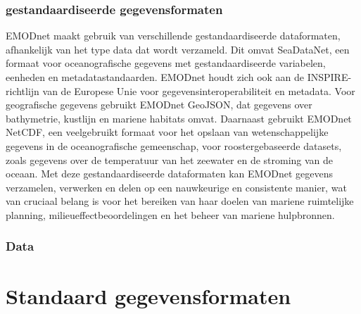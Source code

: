 \subsubsection{gestandaardiseerde gegevensformaten}
EMODnet maakt gebruik van verschillende gestandaardiseerde dataformaten, afhankelijk van het type data dat wordt verzameld. Dit omvat SeaDataNet, een formaat voor oceanografische gegevens met gestandaardiseerde variabelen, eenheden en metadatastandaarden. EMODnet houdt zich ook aan de INSPIRE-richtlijn van de Europese Unie voor gegevensinteroperabiliteit en metadata. Voor geografische gegevens gebruikt EMODnet GeoJSON, dat gegevens over bathymetrie, kustlijn en mariene habitats omvat. Daarnaast gebruikt EMODnet NetCDF, een veelgebruikt formaat voor het opslaan van wetenschappelijke gegevens in de oceanografische gemeenschap, voor roostergebaseerde datasets, zoals gegevens over de temperatuur van het zeewater en de stroming van de oceaan. Met deze gestandaardiseerde dataformaten kan EMODnet gegevens verzamelen, verwerken en delen op een nauwkeurige en consistente manier, wat van cruciaal belang is voor het bereiken van haar doelen van mariene ruimtelijke planning, milieueffectbeoordelingen en het beheer van mariene hulpbronnen.

\subsubsection{Data}

\subsection{}

\subsection{}

\section{Standaard gegevensformaten}
\label{sec:Standaard-gegevensformaten}
